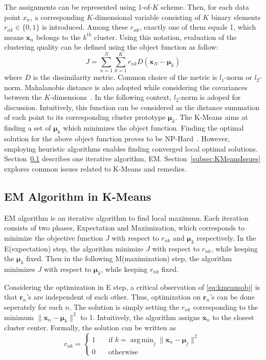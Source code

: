 The assignments can be represented using 1-of-$K$ scheme. Then, for each data point $x_n$, a corresponding  $K$-dimensional variable consisting of $K$ binary elements $r_{nk} \in \{0, 1\}$ is introduced. Among these $r_{nk}$, exactly one of them equals 1, which means $\mathbf{x}_{n}$ belongs to the $k^{th}$ cluster. Using this notation, evaluation of the clustering quality can be defined using the object function as follow:
\begin{equation}	
	\label{eq:kmeansobj}
	J = \sum_{n=1}^{N}\sum_{k=1}^{K}r_{nk}D(\mathbf{x}_{N} - \boldsymbol{\mu}_{k})
\end{equation}
where $D$ is the dissimilarity metric. Common choice of the metric is $\mathit{l}_1$-norm or $\mathit{l}_2$-norm. Mahalanobis distance is also adopted while considering the covariances between the $K$-dimensions~\cite{davis1986statistics}. In the following context, $\mathit{l}_2$-norm is adoped for discussion. 
 Intuitively, this function can be considered as the distance summation of each point to its corresponding cluster prototype $\boldsymbol{\mu}_k$. The K-Means aims at finding a set of $\boldsymbol{\mu}_k$ which minimizes the object function. Finding the optimal solution for the above object function proves to be NP-Hard~\cite{aloise2009np}. However, employing heuristic algorithms enables finding converged local optimal solutions. Section~\ref{subsec:EM} describes one iterative algorithm, EM. Section~\ref{subsec:KMeansIssues} explores common issues related to K-Means and remedies.
\subsection{EM Algorithm in K-Means}
\label{subsec:EM}

EM algorithm is an iterative algorithm to find local maximum. Each iteration consists of two phases, Expectation and Maximization, which corresponds to minimize the objective function $J$ with respect to $r_{nk}$ and $\boldsymbol{\mu}_{k}$ respectively. In the E(expectation) step, the algorithm minimize $J$ with respect to $r_{nk}$, while keeping the $\boldsymbol{\mu}_{k}$ fixed. Then in the following M(maximization) step, the algorithm minimizes $J$ with respect to $\boldsymbol{\mu}_{k}$, while keeping $r_{nk}$ fixed. 

Considering the optimization in E step, a critical observation of \eqref{eq:kmeansobj} is that \(\mathbf{r}_n\)'s are independent of each other. Thus, optimization on \(\mathbf{r}_n\)'s can be done seperately for each \(n\). The solution is simply setting the \(r_{nk}\) corresponding to the minimum \(\| \mathbf{x}_n - \boldsymbol{\mu}_k \|^2\) to 1.  Intuitively, the algorithm assigns \(\mathbf{x}_n\) to the closest cluster center. Formally, the solution can be written as
\begin{equation}
 r_{nk} =
    \begin{cases}
        1   & \quad \text{if } k = \operatorname{arg\,min}_j \parallel \mathbf{x}_{n} - \mathbf{\mu}_{j} {\parallel}^2 \\
        0   & \quad \text{otherwise}
    \end{cases}
\end{equation}


